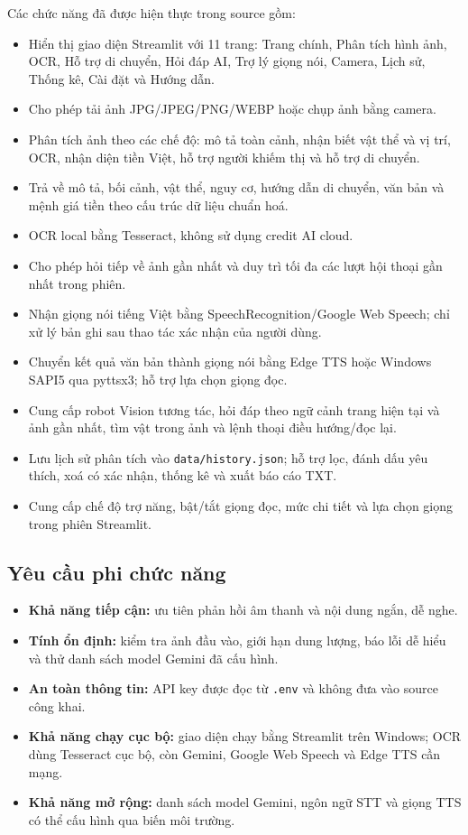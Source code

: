 Các chức năng đã được hiện thực trong source gồm:
\begin{itemize}[leftmargin=1.6em, itemsep=2pt]
  \item Hiển thị giao diện Streamlit với 11 trang: Trang chính, Phân tích hình ảnh, OCR, Hỗ trợ di chuyển, Hỏi đáp AI, Trợ lý giọng nói, Camera, Lịch sử, Thống kê, Cài đặt và Hướng dẫn.
  \item Cho phép tải ảnh JPG/JPEG/PNG/WEBP hoặc chụp ảnh bằng camera.
  \item Phân tích ảnh theo các chế độ: mô tả toàn cảnh, nhận biết vật thể và vị trí, OCR, nhận diện tiền Việt, hỗ trợ người khiếm thị và hỗ trợ di chuyển.
  \item Trả về mô tả, bối cảnh, vật thể, nguy cơ, hướng dẫn di chuyển, văn bản và mệnh giá tiền theo cấu trúc dữ liệu chuẩn hoá.
  \item OCR local bằng Tesseract, không sử dụng credit AI cloud.
  \item Cho phép hỏi tiếp về ảnh gần nhất và duy trì tối đa các lượt hội thoại gần nhất trong phiên.
  \item Nhận giọng nói tiếng Việt bằng SpeechRecognition/Google Web Speech; chỉ xử lý bản ghi sau thao tác xác nhận của người dùng.
  \item Chuyển kết quả văn bản thành giọng nói bằng Edge TTS hoặc Windows SAPI5 qua pyttsx3; hỗ trợ lựa chọn giọng đọc.
  \item Cung cấp robot Vision tương tác, hỏi đáp theo ngữ cảnh trang hiện tại và ảnh gần nhất, tìm vật trong ảnh và lệnh thoại điều hướng/đọc lại.
  \item Lưu lịch sử phân tích vào \texttt{data/history.json}; hỗ trợ lọc, đánh dấu yêu thích, xoá có xác nhận, thống kê và xuất báo cáo TXT.
  \item Cung cấp chế độ trợ năng, bật/tắt giọng đọc, mức chi tiết và lựa chọn giọng trong phiên Streamlit.
\end{itemize}

\subsection{Yêu cầu phi chức năng}

\begin{itemize}[leftmargin=1.6em, itemsep=2pt]
  \item \textbf{Khả năng tiếp cận:} ưu tiên phản hồi âm thanh và nội dung ngắn, dễ nghe.
  \item \textbf{Tính ổn định:} kiểm tra ảnh đầu vào, giới hạn dung lượng, báo lỗi dễ hiểu và thử danh sách model Gemini đã cấu hình.
  \item \textbf{An toàn thông tin:} API key được đọc từ \texttt{.env} và không đưa vào source công khai.
  \item \textbf{Khả năng chạy cục bộ:} giao diện chạy bằng Streamlit trên Windows; OCR dùng Tesseract cục bộ, còn Gemini, Google Web Speech và Edge TTS cần mạng.
  \item \textbf{Khả năng mở rộng:} danh sách model Gemini, ngôn ngữ STT và giọng TTS có thể cấu hình qua biến môi trường.
\end{itemize}

